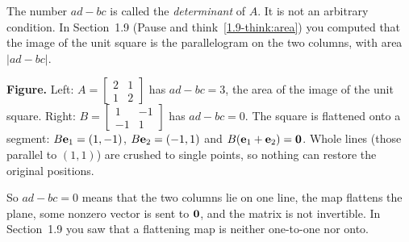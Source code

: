 \documentclass[11pt]{article}
\begin{document}
The number $ad-bc$ is called the \emph{determinant} of $A$. It is not an arbitrary condition. In Section~1.9 (Pause and think~\ref{1.9-think:area}) you computed that the image of the unit square is the parallelogram on the two columns, with area $|ad-bc|$.

\begin{center}
\end{center}

\textbf{Figure.} Left: $A=\begin{bmatrix}2&1\\1&2\end{bmatrix}$ has $ad-bc=3$, the area of the image of the unit square. Right: $B=\begin{bmatrix}1&-1\\-1&1\end{bmatrix}$ has $ad-bc=0$. The square is flattened onto a segment: $B\mathbf{e}_1=(1,-1)$, $B\mathbf{e}_2=(-1,1)$ and $B(\mathbf{e}_1+\mathbf{e}_2)=\mathbf{0}$. Whole lines (those parallel to $(1,1)$) are crushed to single points, so nothing can restore the original positions.

So $ad-bc=0$ means that the two columns lie on one line, the map flattens the plane, some nonzero vector is sent to $\mathbf{0}$, and the matrix is not invertible. In Section~1.9 you saw that a flattening map is neither one-to-one nor onto.
\end{document}
